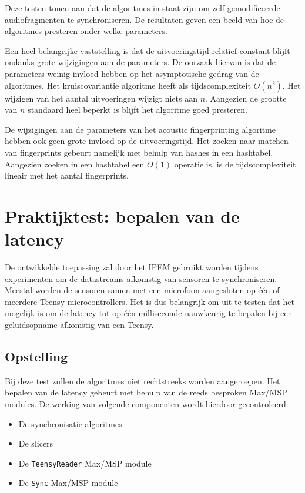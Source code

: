 Deze testen tonen aan dat de algoritmes in staat zijn om zelf gemodificeerde audiofragmenten te synchroniseren. De resultaten geven een beeld van hoe de algoritmes presteren onder welke parameters.

Een heel belangrijke vaststelling is dat de uitvoeringstijd relatief constant blijft ondanks grote wijzigingen aan de parameters. De oorzaak hiervan is dat de parameters weinig invloed hebben op het asymptotische gedrag van de algoritmes. Het kruiscovariantie algoritme heeft als tijdscomplexiteit $ O(n^{2}) $. Het wijzigen van het aantal uitvoeringen wijzigt niets aan $ n $. Aangezien de grootte van $ n $ standaard heel beperkt is blijft het algoritme goed presteren.

De wijzigingen aan de parameters van het acoustic fingerprinting algoritme hebben ook geen grote invloed op de uitvoeringstijd. Het zoeken naar matchen van fingerprints gebeurt namelijk met behulp van hashes in een hashtabel. Aangezien zoeken in een hashtabel een $ O(1) $ operatie is, is de tijdscomplexiteit lineair met het aantal fingerprints.

\section{Praktijktest: bepalen van de latency}
\label{praktijktest}

De ontwikkelde toepassing zal door het IPEM gebruikt worden tijdens experimenten om de datastreams afkomstig van sensoren te synchroniseren. Meestal worden de sensoren samen met een microfoon aangesloten op één of meerdere Teensy microcontrollers. Het is dus belangrijk om uit te testen dat het mogelijk is om de latency tot op één milliseconde nauwkeurig te bepalen bij een geluidsopname afkomstig van een Teensy.

\subsection{Opstelling}

Bij deze test zullen de algoritmes niet rechtstreeks worden aangeroepen. Het bepalen van de latency gebeurt met behulp van de reeds besproken Max/MSP modules. De werking van volgende componenten wordt hierdoor gecontroleerd:
\begin{itemize}[noitemsep]
	\item De synchronisatie algoritmes
	\item De slicers
	\item De \texttt{TeensyReader} Max/MSP module
	\item De \texttt{Sync} Max/MSP module
\end{itemize}

